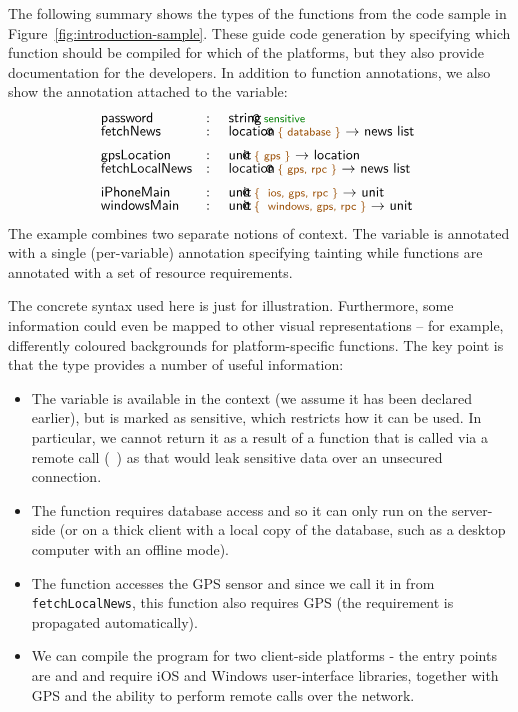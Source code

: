 The following summary shows the types of the functions from the code sample in
Figure~\ref{fig:introduction-sample}. These guide code generation by specifying which
function should be compiled for which of the platforms, but they also provide documentation
for the developers. In addition to function annotations, we also show the annotation attached
to the  variable:
%
\begin{equation*}
\begin{array}{lcl}
 \ident{password} &:& $\introvar{string}{sensitive}$\\[-0.25em]
 \ident{fetchNews} &:& $\introfunc{location}{database}{news~list}$\\[0.5em]
 \ident{gpsLocation} &:& $\introfunc{unit}{gps}{location}$\\[-0.25em]
 \ident{fetchLocalNews} &:& $\introfunc{location}{gps, rpc}{news~list}$\\[0.5em]
 \ident{iPhoneMain} &:& $\introfunc{unit}{ ios, gps, rpc}{unit}$\\[-0.25em]
 \ident{windowsMain} &:& $\introfunc{unit}{ windows, gps, rpc}{unit}$
\end{array}
\end{equation*}
%
The example combines two separate notions of context. The variable  is annotated
with a single (per-variable) annotation specifying tainting while
functions are annotated with a set of resource requirements.

The concrete syntax used here is just for illustration. Furthermore,
some information could even be mapped to other visual representations -- for example, differently
coloured backgrounds for platform-specific functions. The key point is that the type provides a
number of useful information:

\begin{itemize}
\item The  variable is available in the context (we assume it has been declared
  earlier), but is marked as sensitive, which restricts how it can be used. In particular, we
  cannot return it as a result of a function that is called via a remote call (\eg~)
  as that would leak sensitive data over an unsecured connection.

\item The  function requires database access and so it can only run on the server-side
  (or on a thick client with a local copy of the database, such as a desktop computer with an offline mode).

\item The  function accesses the GPS sensor and since we call it in
  from \texttt{fetchLocalNews}, this function also requires GPS (the requirement is propagated
  automatically).

\item We can compile the program for two client-side platforms - the entry points are 
  and  and require iOS and Windows user-interface libraries, together with
  GPS and the ability to perform remote calls over the network.
\end{itemize}

